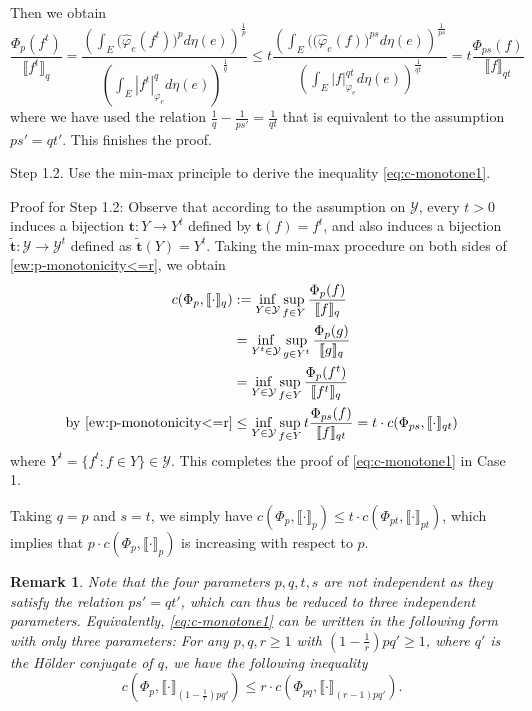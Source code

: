 \documentclass[12pt,a4paper]{article}
\newtheorem{remark}[theorem]{Remark}
\begin{document}
Then we obtain 
\[ \frac{\Phi_p(f^t)}{ \big\llbracket f^t\big\rrbracket_{q}}=\frac{\left(\int_E\big(\widehat{\varphi}_e(f^t)\big)^pd\eta(e)\right)^{\frac1p}}{\left(\int_E|f^t|_{\varphi_e}^{q}d\eta(e)\right)^{\frac{1}{q}}} \le t\frac{\left(\int_E\big((\widehat{\varphi}_e(f)\big)^{ps}d\eta(e)\right)^{\frac{1}{ps}}}{\left(\int_E|f|_{\varphi_e}^{qt}d\eta(e)\right)^{\frac{1}{qt}}}=t\frac{\Phi_{ps}(f)}{\big\llbracket f\big\rrbracket_{qt}}
\]
where we have used the relation $\frac1q-\frac{1}{ps'}=\frac{1}{qt}$ that is equivalent to the assumption $ps'=qt'$. This finishes the proof.


Step 1.2. Use the min-max principle to derive the inequality \eqref{eq:c-monotone1}.

Proof for Step 1.2: Observe that according to  the assumption on $\mathcal{Y}$, every $t>0$ induces a bijection $\mathbf{t}:Y\to Y^t$ defined by $\mathbf{t}(f)= f^t$, and also induces a bijection $\tilde{\mathbf{t}}:\mathcal{Y}\to \mathcal{Y}^t$ defined as  $\tilde{\mathbf{t}}(Y)= Y^t$. 
Taking the min-max procedure on both sides of \eqref{ew:p-monotonicity<=r}, we obtain 
\begin{align*}
c(\Phi_p,\llbracket\cdot\rrbracket_{ q })&:=\inf\limits_{Y\in \mathcal{Y}}\sup\limits_{f\in Y} \frac{\Phi_p(f)}{\llbracket f \rrbracket_{q}}
\\&
=\inf\limits_{Y^t\in \mathcal{Y}}\sup\limits_{g\in Y^t} \frac{\Phi_p(g)}{\llbracket g\rrbracket_{q}}
\\&=\inf\limits_{Y\in \mathcal{Y}}\sup\limits_{f\in Y} \frac{\Phi_p(f^t)}{\llbracket f^t\rrbracket_{q}}
\\ \text{by \eqref{ew:p-monotonicity<=r}}&\le\inf\limits_{Y\in \mathcal{Y}}\sup\limits_{f\in Y}  t\frac{\Phi_{ps}(f)}{\llbracket f\rrbracket_{qt}}=t\cdot  c(\Phi_{ps},\llbracket\cdot\rrbracket_{qt})
\end{align*}
where $Y^t=\{f^t:f\in Y\}\in \mathcal{Y}$. 
This completes the proof of \eqref{eq:c-monotone1} in Case 1. 

Taking $q=p$ and $s=t$, we simply  have $c(\Phi_p,\llbracket \cdot\rrbracket_{p})\le t\cdot  c(\Phi_{pt},\llbracket \cdot\rrbracket_{pt})$, which implies that $p\cdot c(\Phi_p,\llbracket \cdot\rrbracket_{p})$ is increasing with respect to $p$. 

\begin{remark}\label{rem:4-3parameters}
Note that the four parameters $p,q,t,s$ are not independent as they satisfy the relation $ps'=qt'$, which can thus be reduced to three independent parameters. 
Equivalently, \eqref{eq:c-monotone1} can be written in the following form with only three parameters:
For any $p,q,r\ge1$ with  
$(1-\frac1r)pq'\ge1$, where $q'$ is the H\"older conjugate of $q$, we have the following inequality 
\begin{equation}\label{eq:c-monotone12}
c(\Phi_p,\llbracket \cdot\rrbracket_{  (1-\frac1r)pq' })\le r\cdot  c(\Phi_{pq},\llbracket \cdot\rrbracket_{(r-1)pq'}).    
\end{equation}

\end{remark}
\end{document}
